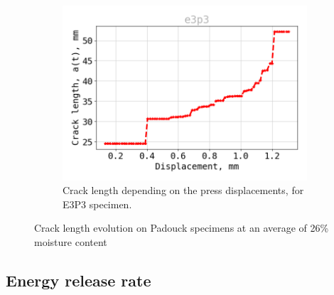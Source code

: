 \begin{figure}[H]
\begin{subfigure}{0.48\linewidth}
	\centering
	\includegraphics[scale=0.3]{Figures/e3p3_a}
	\decoRule
	\caption[Crack length E3P3]{Crack length depending on the press displacements, for E3P3 specimen.}
	\label{fig:E3P3_a}
\end{subfigure}
\caption{Crack length evolution on Padouck specimens at an average of 26\% moisture content}
\label{E3p_a}
\end{figure}
\newpage
\subsection{Energy release rate}


